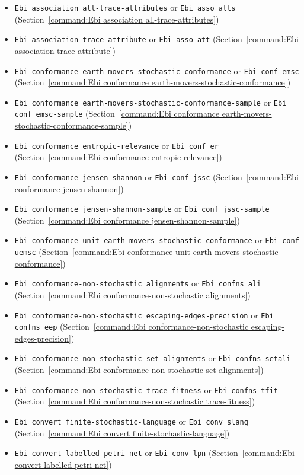 {\begin{itemize}
\item\texttt{Ebi association all-trace-attributes} or \texttt{Ebi asso atts} (Section~\ref{command:Ebi association all-trace-attributes})
\item\texttt{Ebi association trace-attribute} or \texttt{Ebi asso att} (Section~\ref{command:Ebi association trace-attribute})
\item\texttt{Ebi conformance earth-movers-stochastic-conformance} or \texttt{Ebi conf emsc} (Section~\ref{command:Ebi conformance earth-movers-stochastic-conformance})
\item\texttt{Ebi conformance earth-movers-stochastic-conformance-sample} or \texttt{Ebi conf emsc-sample} (Section~\ref{command:Ebi conformance earth-movers-stochastic-conformance-sample})
\item\texttt{Ebi conformance entropic-relevance} or \texttt{Ebi conf er} (Section~\ref{command:Ebi conformance entropic-relevance})
\item\texttt{Ebi conformance jensen-shannon} or \texttt{Ebi conf jssc} (Section~\ref{command:Ebi conformance jensen-shannon})
\item\texttt{Ebi conformance jensen-shannon-sample} or \texttt{Ebi conf jssc-sample} (Section~\ref{command:Ebi conformance jensen-shannon-sample})
\item\texttt{Ebi conformance unit-earth-movers-stochastic-conformance} or \texttt{Ebi conf uemsc} (Section~\ref{command:Ebi conformance unit-earth-movers-stochastic-conformance})
\item\texttt{Ebi conformance-non-stochastic alignments} or \texttt{Ebi confns ali} (Section~\ref{command:Ebi conformance-non-stochastic alignments})
\item\texttt{Ebi conformance-non-stochastic escaping-edges-precision} or \texttt{Ebi confns eep} (Section~\ref{command:Ebi conformance-non-stochastic escaping-edges-precision})
\item\texttt{Ebi conformance-non-stochastic set-alignments} or \texttt{Ebi confns setali} (Section~\ref{command:Ebi conformance-non-stochastic set-alignments})
\item\texttt{Ebi conformance-non-stochastic trace-fitness} or \texttt{Ebi confns tfit} (Section~\ref{command:Ebi conformance-non-stochastic trace-fitness})
\item\texttt{Ebi convert finite-stochastic-language} or \texttt{Ebi conv slang} (Section~\ref{command:Ebi convert finite-stochastic-language})
\item\texttt{Ebi convert labelled-petri-net} or \texttt{Ebi conv lpn} (Section~\ref{command:Ebi convert labelled-petri-net})

\end{itemize}}
